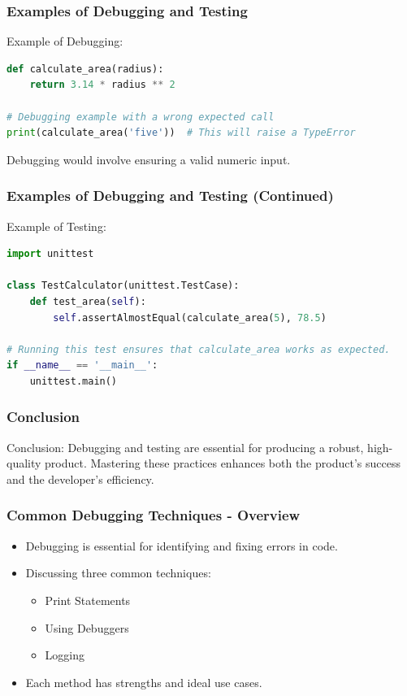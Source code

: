 \documentclass{beamer}
\begin{document}
\begin{frame}[fragile]
    \frametitle{Examples of Debugging and Testing}
    \begin{block}{Example of Debugging:}
        \begin{lstlisting}[language=python]
def calculate_area(radius):
    return 3.14 * radius ** 2

# Debugging example with a wrong expected call
print(calculate_area('five'))  # This will raise a TypeError
        \end{lstlisting}
        Debugging would involve ensuring a valid numeric input.
    \end{block}
\end{frame}

\begin{frame}[fragile]
    \frametitle{Examples of Debugging and Testing (Continued)}
    \begin{block}{Example of Testing:}
        \begin{lstlisting}[language=python]
import unittest

class TestCalculator(unittest.TestCase):
    def test_area(self):
        self.assertAlmostEqual(calculate_area(5), 78.5)

# Running this test ensures that calculate_area works as expected.
if __name__ == '__main__':
    unittest.main()
        \end{lstlisting}
    \end{block}
\end{frame}

\begin{frame}[fragile]
    \frametitle{Conclusion}
    \begin{block}{Conclusion:}
        Debugging and testing are essential for producing a robust, high-quality product. 
        Mastering these practices enhances both the product's success and the developer's efficiency.
    \end{block}
\end{frame}

\begin{frame}[fragile]
    \frametitle{Common Debugging Techniques - Overview}
    \begin{itemize}
        \item Debugging is essential for identifying and fixing errors in code.
        \item Discussing three common techniques:
        \begin{itemize}
            \item Print Statements
            \item Using Debuggers
            \item Logging
        \end{itemize}
        \item Each method has strengths and ideal use cases.
    \end{itemize}
\end{frame}
\end{document}
